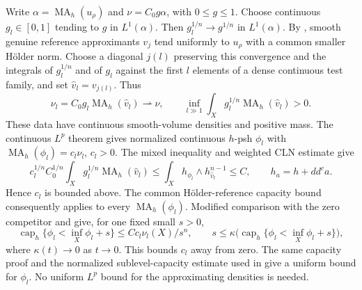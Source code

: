 \documentclass[11pt]{article}
\newcommand{\ddc}{dd^c}
\newcommand{\MA}{\operatorname{MA}}
\begin{document}
Write $\alpha=\MA_h(u_\rho)$ and $\nu=C_0g\alpha$, with $0\leq g\leq1$.
Choose continuous $g_l\in[0,1]$ tending to $g$ in $L^1(\alpha)$.
Then $g_l^{1/n}\to g^{1/n}$ in $L^1(\alpha)$. By
\cite[Lemma 2.1]{KN}, smooth genuine reference approximants $v_j$ tend
uniformly to $u_\rho$ with a common smaller H\"older norm. Choose a
diagonal $j(l)$ preserving this convergence and the integrals of
$g_l^{1/n}$ and of $g_l$ against the first $l$ elements of a dense
continuous test family, and set $\widehat v_l=v_{j(l)}$. Thus
\[
 \nu_l=C_0g_l\MA_h(\widehat v_l)\rightharpoonup\nu,\qquad
 \inf_{l\gg1}\int_Xg_l^{1/n}\MA_h(\widehat v_l)>0.
\]
These data have continuous smooth-volume densities and positive mass.
The continuous $L^p$ theorem \cite[Theorem 0.1]{KN13} gives normalized
continuous $h$-psh $\phi_l$ with $\MA_h(\phi_l)=c_l\nu_l$, $c_l>0$.
The mixed inequality and weighted CLN estimate
\cite[Proposition 1.1 and Lemma 1.9]{Ngu} give
\[
 c_l^{1/n}C_0^{1/n}\int_Xg_l^{1/n}\MA_h(\widehat v_l)
 \leq\int_Xh_{\phi_l}\wedge h_{\widehat v_l}^{n-1}\leq C,
 \qquad h_a=h+\ddc a.
\]
Hence $c_l$ is bounded above. The common H\"older-reference capacity
bound \cite[Lemma 2.3]{KN} consequently applies to every
$\MA_h(\phi_l)$. Modified comparison with the zero competitor and
\cite[Theorem 5.3 and Lemma 5.4]{KN13} give, for one fixed small $s>0$,
\[
 \operatorname{cap}_h\{\phi_l<\inf_X\phi_l+s\}
 \leq Cc_l\nu_l(X)/s^n,\qquad
 s\leq\kappa\bigl(\operatorname{cap}_h\{\phi_l<\inf_X\phi_l+s\}\bigr),
\]
where $\kappa(t)\to0$ as $t\to0$. This bounds $c_l$ away from zero.
The same capacity proof and the normalized sublevel-capacity estimate
used in \cite[Corollary 5.6]{KN13} give a uniform bound for $\phi_l$.
No uniform $L^p$ bound for the approximating densities is needed.
\end{document}
